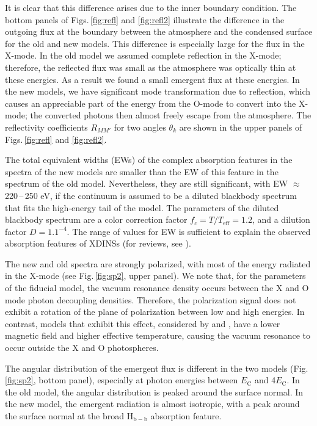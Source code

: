 \documentclass{aa}
\newcommand{\EC}{E_\mathrm{C}}
\newcommand{\Teff}{T_\mathrm{eff}}
\begin{document}
It is clear that this difference arises due to the inner
boundary condition. The bottom panels of 
Figs.\,\ref{fig:refl} and \ref{fig:refl2} illustrate the
difference in the outgoing flux at the boundary between the
atmosphere and the condensed surface for the old and new
models. This difference is especially large for the flux in
the X-mode. In the old model we assumed complete
reflection in the X-mode; therefore, the reflected flux was 
small as the atmosphere was optically thin at these
energies. As a result we found a small emergent flux at these
energies. In the new models, we have significant mode
transformation due to reflection, which causes an
appreciable part of the energy from the O-mode to convert
into the X-mode; the converted photons then almost 
freely escape from the atmosphere. The reflectivity 
coefficients $R_{MM'}$ for two angles $\theta_k$ are shown 
in the upper panels of Figs.\,\ref{fig:refl} and \ref{fig:refl2}. 

The total equivalent widths (EWs) of the complex absorption
features in the spectra of the new models are smaller  than
the EW of this feature in the spectrum of the old model.
Nevertheless, they are still significant, with EW $\approx$
220\,--\,250 eV, if the continuum is assumed to be a diluted
blackbody spectrum that fits the high-energy tail of the
model. The parameters of the diluted blackbody  spectrum are
a color correction factor $f_c = T/\Teff = 1.2$, and a
dilution factor $D = 1.1^{-4}$.  The range of values for EW
is sufficient to explain the observed absorption features of
XDINSs (for reviews, see \citealt{Haberl07,Turolla09}).

The new and old spectra are strongly polarized, with most of
the  energy radiated in the X-mode (see Fig.\,\ref{fig:sp2},
upper panel). 
We note that, for the parameters of the fiducial model, the
vacuum resonance density occurs between the X and O mode
photon decoupling densities.  Therefore, the polarization
signal does not exhibit a rotation of the plane of
polarization between low and high energies. In contrast,
models that exhibit this effect, considered by \citet{LaiHo03} and
\citet{vanAdelsbergLai06}, have a
lower magnetic field and higher effective temperature,
causing the vacuum resonance to occur outside the X and O
photospheres.

The angular distribution of the
emergent flux is different in the two models
(Fig.\,\ref{fig:sp2}, bottom panel),  especially at photon
energies between $\EC$ and 4$\EC$. In the old model, the
angular distribution is peaked around the surface normal. In
the new model, the emergent radiation is almost isotropic,
with a peak  around the surface normal at the broad 
H$_\mathrm{b-b}$ absorption feature.
\end{document}

